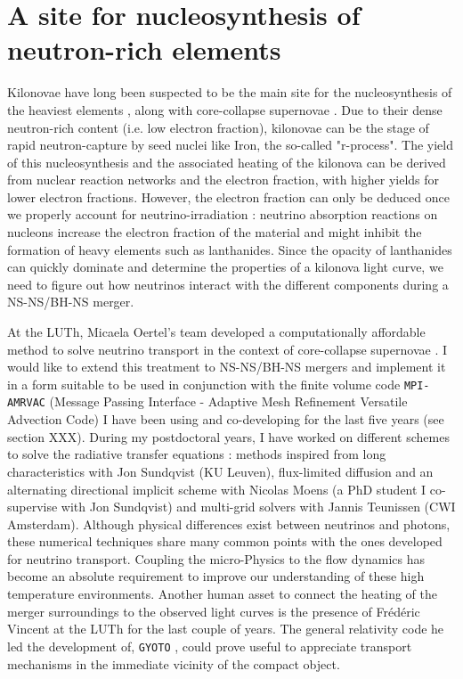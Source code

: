 \documentclass[12pt,onecolumn]{article}
\makeatletter
\newcommand*{\ns}{NS\@\xspace}
\newcommand*{\bh}{BH\@\xspace}
\newcommand*{\ie}{i.e.\@\xspace}
\makeatother
\begin{document}
\section{A site for nucleosynthesis of neutron-rich elements}

Kilonovae have long been suspected to be the main site for the nucleosynthesis of the heaviest elements \cite{Lattimer1974}, along with core-collapse supernovae \cite{MacFadyen1999}. Due to their dense neutron-rich content (\ie low electron fraction), kilonovae can be the stage of rapid neutron-capture by seed nuclei like Iron, the so-called "r-process". The yield of this nucleosynthesis and the associated heating of the kilonova can be derived from nuclear reaction networks \cite{Metzger2010} and the electron fraction, with higher yields for lower electron fractions. However, the electron fraction can only be deduced once we properly account for neutrino-irradiation : neutrino absorption reactions on nucleons increase the electron fraction of the material and might inhibit the formation of heavy elements such as lanthanides. Since the opacity of lanthanides can quickly dominate and determine the properties of a kilonova light curve, we need to figure out how neutrinos interact with the different components during a \ns-\ns/\bh-\ns merger.

At the LUTh, Micaela Oertel's team developed a computationally affordable method to solve neutrino transport in the context of core-collapse supernovae \cite{Peres2011}. I would like to extend this treatment to \ns-\ns/\bh-\ns mergers and implement it in a form suitable to be used in conjunction with the finite volume code \texttt{MPI-AMRVAC} (Message Passing Interface - Adaptive Mesh Refinement Versatile Advection Code) I have been using and co-developing for the last five years (see section XXX). During my postdoctoral years, I have worked on different schemes to solve the radiative transfer equations : methods inspired from long characteristics with Jon Sundqvist (KU Leuven), flux-limited diffusion and an alternating directional implicit scheme with Nicolas Moens (a PhD student I co-supervise with Jon Sundqvist) and multi-grid solvers with Jannis Teunissen (CWI Amsterdam). Although physical differences exist between neutrinos and photons, these numerical techniques share many common points with the ones developed for neutrino transport. Coupling the micro-Physics to the flow dynamics has become an absolute requirement to improve our understanding of these high temperature environments. Another human asset to connect the heating of the merger surroundings to the observed light curves is the presence of Frédéric Vincent at the LUTh for the last couple of years. The general relativity code he led the development of, \texttt{GYOTO} \cite{Vincent2011}, could prove useful to appreciate transport mechanisms in the immediate vicinity of the compact object.
\end{document}
